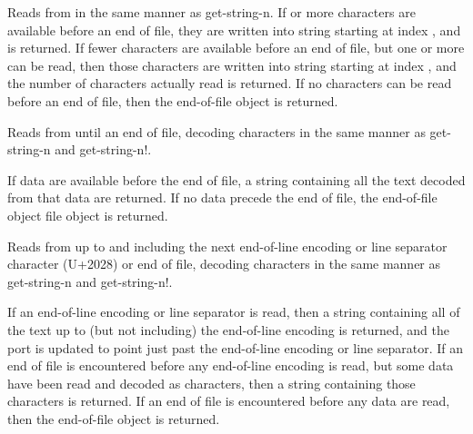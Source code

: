 \begin{entry}{%
}


Reads from  in the same manner as {\cf
  get-string-n}.  If  or more characters are available
before an end of file, they are written into string
starting at index , and  is returned. If fewer
characters are available before an end of file, but one
or more can be read, then those characters are written into string
starting at index , and the number of characters actually read is
returned. If no characters can be read before an end of file,
then the end-of-file object is returned.
\end{entry}   

\begin{entry}{%
}
   
Reads from  until an end of file, decoding
characters in the same manner as {\cf get-string-n} and {\cf get-string-n!}.
   
If data are available before the end of file, a string
containing all the text decoded from that data are returned. If no data
precede the end of file, the end-of-file object file object is
returned.
\end{entry}

\begin{entry}{%
}
   
Reads from  up to and including the next
end-of-line encoding or line separator character (U+2028) or 
end of file, decoding characters in the same manner as {\cf
  get-string-n} and {\cf get-string-n!}.
   
If an end-of-line encoding or line separator is read, then a string
containing all of the text up to (but not including) the end-of-line
encoding is returned, and the port is updated to point just past the
end-of-line encoding or line separator. If an end of file is
encountered before any end-of-line encoding is read, but some data
have been read and decoded as characters, then a string containing
those characters is returned. If an end of file is encountered before
any data are read, then the end-of-file object is
returned.
\end{entry}

